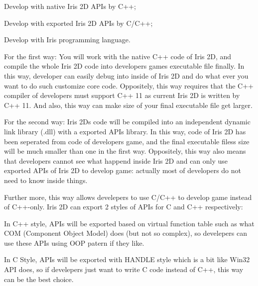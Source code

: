 \begin{DoxyItemize}
\item Develop with native Iris 2D A\+P\+Is by C++; \item Develop with exported Iris 2D A\+P\+Is by C/\+C++; \item Develop with Iris programming language.\end{DoxyItemize}
\begin{DoxyParagraph}{For the first way\+:}
You will work with the native C++ code of Iris 2D, and compile the whole Iris 2D code into developers\textquotesingle{} games\textquotesingle{} executable file finally. In this way, developer can easily debug into inside of Iris 2D and do what ever you want to do such customize core code. Oppositely, this way requires that the C++ compiler of developers must support C++ 11 as current Iris 2D is written by C++ 11. And also, this way can make size of your final executable file get larger. 
\end{DoxyParagraph}
\begin{DoxyParagraph}{For the second way\+:}
Iris 2D\textquotesingle{}s code will be compiled into an independent dynamic link library (.dll) with a exported A\+P\+Is library. In this way, code of Iris 2D has been seperated from code of developer\textquotesingle{}s game, and the final executable files\textquotesingle{}s size will be much smaller than one in the first way. Oppositely, this way also means that developers cannot see what happend inside Iris 2D and can only use exported A\+P\+Is of Iris 2D to develop game\+: actually most of developers do not need to know inside things. 
\end{DoxyParagraph}
\begin{DoxyParagraph}{}
Further more, this way allows develepers to use C/\+C++ to develop game instead of C++-\/only. Iris 2D can export 2 styles of A\+P\+Is for C and C++ respectively\+: 
\end{DoxyParagraph}
\begin{DoxyParagraph}{}
\begin{DoxyItemize}
\item In C++ style, A\+P\+Is will be exported based on virtual function table such as what C\+OM (Component Object Model) does (but not so complex), so develepers can use these A\+P\+Is using O\+OP patern if they like. \item In C Style, A\+P\+Is will be exported with H\+A\+N\+D\+LE style which is a bit like Win32 A\+PI does, so if develepers just want to write C code instead of C++, this way can be the best choice.\end{DoxyItemize}

\end{DoxyParagraph}
